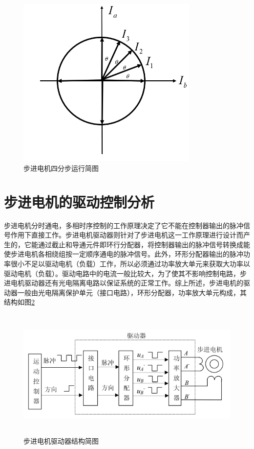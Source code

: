 \begin{figure}[htbp!]
	\centering
	\includegraphics[height=8.5cm]{chap/figure/4-11.jpg}
	\caption{步进电机四分步运行简图}
	\label{fig:4-3}
\end{figure}

\section{步进电机的驱动控制分析}
步进电机分时通电，多相时序控制的工作原理决定了它不能在控制器输出的脉冲信号作用下直接工作。步进电机驱动器则针对了步进电机这一工作原理进行设计而产生的，它能通过截止和导通元件即环行分配器，将控制器输出的脉冲信号转换成能使步进电机各相绕组按一定顺序通电的脉冲信号。此外，环形分配器输出的脉冲功率很小不足以驱动电机（负载）工作，所以必须通过功率放大单元来获取大功率以驱动电机（负载）。驱动电路中的电流一般比较大，为了使其不影响控制电路，步进电机驱动器还有光电隔离电路以保证系统的正常工作。综上所述，步进电机的驱动器一般由光电隔离保护单元（接口电路），环形分配器，功率放大单元构成，其结构如图\ref{fig:4-6}

\begin{figure}[htbp!]
	\centering
	\includegraphics[height=6.5cm]{chap/figure/4-6.jpg}
	\caption{步进电机驱动器结构简图}
	\label{fig:4-6}
\end{figure}

